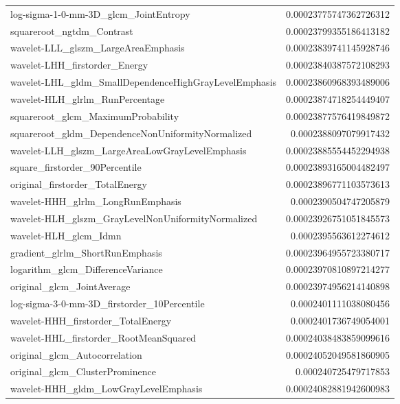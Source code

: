 {\begin{xltabular}[H]{\textwidth}{X r}
        log-sigma-1-0-mm-3D\_glcm\_JointEntropy & 0.00023775747362726312 \\
        squareroot\_ngtdm\_Contrast & 0.00023799355186413182 \\
        wavelet-LLL\_glszm\_LargeAreaEmphasis & 0.00023839741145928746 \\
        wavelet-LHH\_firstorder\_Energy & 0.00023840387572108293 \\
        wavelet-LHL\_gldm\_SmallDependenceHighGrayLevelEmphasis & 0.00023860968393489006 \\
        wavelet-HLH\_glrlm\_RunPercentage & 0.00023874718254449407 \\
        squareroot\_glcm\_MaximumProbability & 0.00023877576419849872 \\
        squareroot\_gldm\_DependenceNonUniformityNormalized & 0.0002388097079917432 \\
        wavelet-LLH\_glszm\_LargeAreaLowGrayLevelEmphasis & 0.00023885554452294938 \\
        square\_firstorder\_90Percentile & 0.00023893165004482497 \\
        original\_firstorder\_TotalEnergy & 0.00023896771103573613 \\
        wavelet-HHH\_glrlm\_LongRunEmphasis & 0.0002390504747205879 \\
        wavelet-HLH\_glszm\_GrayLevelNonUniformityNormalized & 0.00023926751051845573 \\
        wavelet-HLH\_glcm\_Idmn & 0.0002395563612274612 \\
        gradient\_glrlm\_ShortRunEmphasis & 0.00023964955723380717 \\
        logarithm\_glcm\_DifferenceVariance & 0.00023970810897214277 \\
        original\_glcm\_JointAverage & 0.00023974956214140898 \\
        log-sigma-3-0-mm-3D\_firstorder\_10Percentile & 0.0002401111038080456 \\
        wavelet-HHH\_firstorder\_TotalEnergy & 0.0002401736749054001 \\
        wavelet-HHL\_firstorder\_RootMeanSquared & 0.00024038483859099616 \\
        original\_glcm\_Autocorrelation & 0.00024052049581860905 \\
        original\_glcm\_ClusterProminence & 0.000240725479717853 \\
        wavelet-HHH\_gldm\_LowGrayLevelEmphasis & 0.00024082881942600983 \\

\end{xltabular}}

